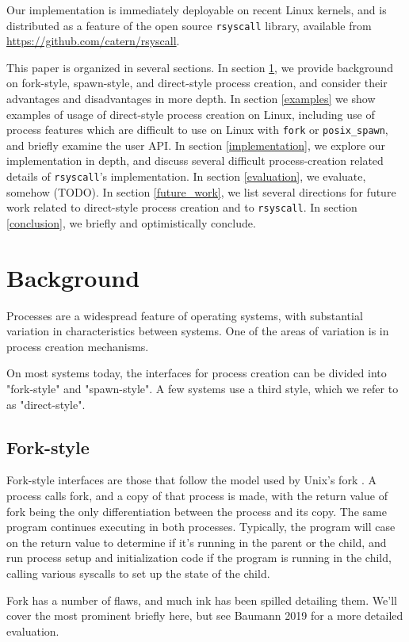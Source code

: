 \documentclass{acmart}
\begin{document}
Our implementation is immediately deployable on recent Linux kernels,
and is distributed as a feature of the open source \texttt{rsyscall} library,
available from \url{https://github.com/catern/rsyscall}.

This paper is organized in several sections.
In section \ref{background}, we provide background on fork-style, spawn-style, and direct-style process creation,
and consider their advantages and disadvantages in more depth.
In section \ref{examples} we show examples of usage of direct-style process creation on Linux,
including use of process features which are difficult to use on Linux with \texttt{fork} or \texttt{posix\_spawn},
and briefly examine the user API.
In section \ref{implementation}, we explore our implementation in depth,
and discuss several difficult process-creation related details of \texttt{rsyscall}'s implementation.
In section \ref{evaluation}, we evaluate, somehow (TODO).
In section \ref{future_work},
we list several directions for future work related to direct-style process creation and to \texttt{rsyscall}.
In section \ref{conclusion}, we briefly and optimistically conclude.

\section{Background}\label{background}
Processes are a widespread feature of operating systems,
with substantial variation in characteristics between systems.
One of the areas of variation is in process creation mechanisms.

On most systems today,
the interfaces for process creation
can be divided into "fork-style" and "spawn-style".
A few systems use a third style, which we refer to as "direct-style".
\subsection{Fork-style}
Fork-style interfaces are those that follow the model used by Unix's fork \cite{forkhist}.
A process calls fork, and a copy of that process is made,
with the return value of fork being the only differentiation between the process and its copy.
The same program continues executing in both processes.
Typically, the program will case on the return value to determine if it's running in the parent or the child,
and run process setup and initialization code if the program is running in the child,
calling various syscalls to set up the state of the child.

Fork has a number of flaws,
and much ink has been spilled detailing them.
We'll cover the most prominent briefly here,
but see Baumann 2019 \cite{forkroad} for a more detailed evaluation.
\end{document}
